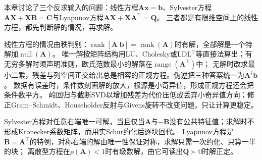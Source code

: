 本章讨论了三个反求输入的问题：线性方程$\bm A\bm x=\bm b$、Sylvester方程$\bm A\bm X+\bm X\bm B=\bm C$与Lyapunov方程$\bm A\bm X+\bm X\bm A^\top=\bm Q$。
三者都是有限维空间上的线性方程，都先判断解的情况，再求解。

线性方程的情况由秩判别：$\operatorname{rank}[\bm A\;\bm b]=\operatorname{rank}(\bm A)$时有解，全部解是一个特解加$\operatorname{null}(\bm A)$。
唯一解按矩阵结构用LU、Cholesky或LDL$^{\top}$等直接法算出；有无穷多解时须声明准则，欧氏范数最小的解落在$\operatorname{range}(\bm A^\top)$中；
无解时改求最小二乘，残差与列空间正交给出总是相容的正规方程。伪逆把三种答案统一为$\bm A^\dagger\bm b$。
数据有误差时，条件数刻画解的放大，根源是小奇异值，形成正规方程还会把条件数平方。
岭回归与截断SVD以增加残差为代价压低或丢弃小奇异值方向；修正Gram--Schmidt、Householder反射与Givens旋转不改变问题，只让计算更稳定。

Sylvester方程对任意右端唯一可解，当且仅当$\bm A$与$-\bm B$没有公共特征值；求解时不形成Kronecker系数矩阵，而用实Schur约化后逐块回代。
Lyapunov方程是$\bm B=\bm A^\top$的特例，对称右端的解由唯一性保证对称，求解只需一次约化、只算一半的块；
离散型方程在$\rho(\bm A)<1$时有级数解，由它可读出$\bm Q\succ0$时解正定。
